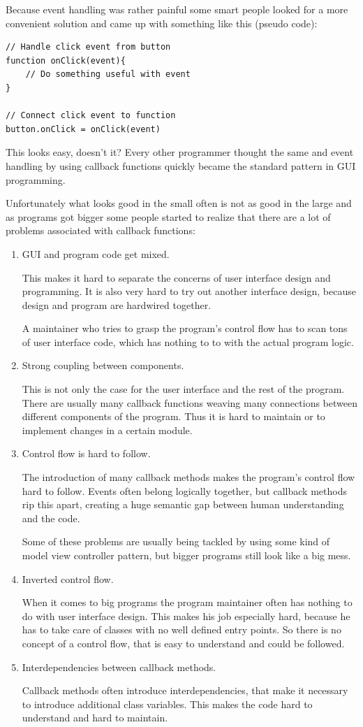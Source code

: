 Because event handling was rather painful some smart people looked for a
more convenient solution and came up with something like this (pseudo
code):

\begin{verbatim}
// Handle click event from button
function onClick(event){
    // Do something useful with event
}

// Connect click event to function
button.onClick = onClick(event)
\end{verbatim}

This looks easy, doesn't it? Every other programmer thought the same and
event handling by using callback functions quickly became the standard
pattern in GUI programming.

Unfortunately what looks good in the small often is not as good in the
large and as programs got bigger some people started to realize that
there are a lot of problems associated with callback functions:

\begin{enumerate}
\item
  GUI and program code get mixed.

  This makes it hard to separate the concerns of user interface design
  and programming. It is also very hard to try out another interface
  design, because design and program are hardwired together.

  A maintainer who tries to grasp the program's control flow has to scan
  tons of user interface code, which has nothing to to with the actual
  program logic.
\item
  Strong coupling between components.

  This is not only the case for the user interface and the rest of the
  program. There are usually many callback functions weaving many
  connections between different components of the program. Thus it is
  hard to maintain or to implement changes in a certain module.
\item
  Control flow is hard to follow.

  The introduction of many callback methods makes the program's control
  flow hard to follow. Events often belong logically together, but
  callback methods rip this apart, creating a huge semantic gap between
  human understanding and the code.

  Some of these problems are usually being tackled by using some kind of
  model view controller pattern, but bigger programs still look like a
  big mess.
\item
  Inverted control flow.

  When it comes to big programs the program maintainer often has nothing
  to do with user interface design. This makes his job especially hard,
  because he has to take care of classes with no well defined entry
  points. So there is no concept of a control flow, that is easy to
  understand and could be followed.
\item
  Interdependencies between callback methods.

  Callback methods often introduce interdependencies, that make it
  necessary to introduce additional class variables. This makes the code
  hard to understand and hard to maintain.
\end{enumerate}

